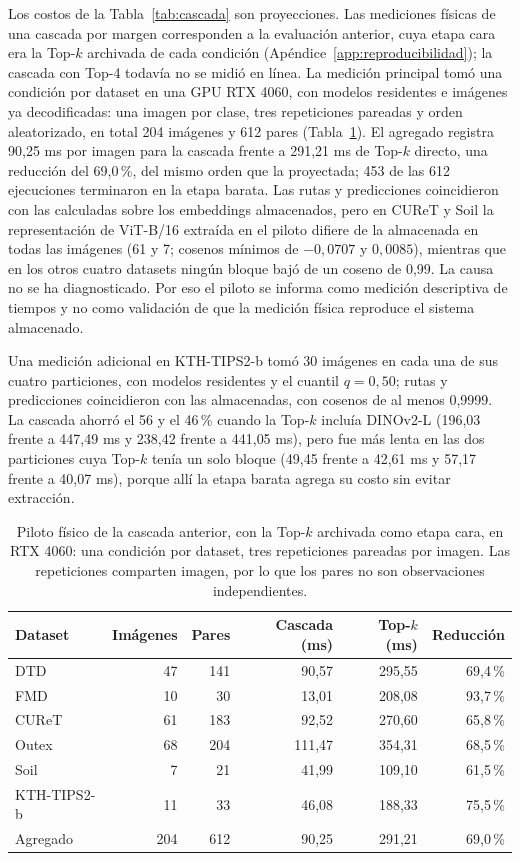 \documentclass[a4paper,fleqn]{cas-sc}
\begin{document}
Los costos de la Tabla~\ref{tab:cascada} son proyecciones. Las mediciones físicas de una cascada por margen corresponden a la evaluación anterior, cuya etapa cara era la Top-$k$ archivada de cada condición (Apéndice~\ref{app:reproducibilidad}); la cascada con Top-4 todavía no se midió en línea. La medición principal tomó una condición por dataset en una GPU RTX 4060, con modelos residentes e imágenes ya decodificadas: una imagen por clase, tres repeticiones pareadas y orden aleatorizado, en total 204 imágenes y 612 pares (Tabla~\ref{tab:piloto}). El agregado registra 90,25 ms por imagen para la cascada frente a 291,21 ms de Top-$k$ directo, una reducción del 69,0\,\%, del mismo orden que la proyectada; 453 de las 612 ejecuciones terminaron en la etapa barata. Las rutas y predicciones coincidieron con las calculadas sobre los embeddings almacenados, pero en CUReT y Soil la representación de ViT-B/16 extraída en el piloto difiere de la almacenada en todas las imágenes (61 y 7; cosenos mínimos de $-0{,}0707$ y $0{,}0085$), mientras que en los otros cuatro datasets ningún bloque bajó de un coseno de 0,99. La causa no se ha diagnosticado. Por eso el piloto se informa como medición descriptiva de tiempos y no como validación de que la medición física reproduce el sistema almacenado.

Una medición adicional en KTH-TIPS2-b tomó 30 imágenes en cada una de sus cuatro particiones, con modelos residentes y el cuantil $q=0{,}50$; rutas y predicciones coincidieron con las almacenadas, con cosenos de al menos 0,9999. La cascada ahorró el 56 y el 46\,\% cuando la Top-$k$ incluía DINOv2-L (196,03 frente a 447,49 ms y 238,42 frente a 441,05 ms), pero fue más lenta en las dos particiones cuya Top-$k$ tenía un solo bloque (49,45 frente a 42,61 ms y 57,17 frente a 40,07 ms), porque allí la etapa barata agrega su costo sin evitar extracción.

\begin{table}[pos=htbp]
\centering
\caption{Piloto físico de la cascada anterior, con la Top-$k$ archivada como etapa cara, en RTX 4060: una condición por dataset, tres repeticiones pareadas por imagen. Las repeticiones comparten imagen, por lo que los pares no son observaciones independientes.}
\label{tab:piloto}
\small
\begin{tabular}{@{}lrrrrr@{}}
\toprule
Dataset & Imágenes & Pares & Cascada (ms) & Top-$k$ (ms) & Reducción \\
\midrule
DTD & 47 & 141 & 90,57 & 295,55 & 69,4\,\% \\
FMD & 10 & 30 & 13,01 & 208,08 & 93,7\,\% \\
CUReT & 61 & 183 & 92,52 & 270,60 & 65,8\,\% \\
Outex & 68 & 204 & 111,47 & 354,31 & 68,5\,\% \\
Soil & 7 & 21 & 41,99 & 109,10 & 61,5\,\% \\
KTH-TIPS2-b & 11 & 33 & 46,08 & 188,33 & 75,5\,\% \\
\midrule
Agregado & 204 & 612 & 90,25 & 291,21 & 69,0\,\% \\
\bottomrule
\end{tabular}
\end{table}
\FloatBarrier
\end{document}
